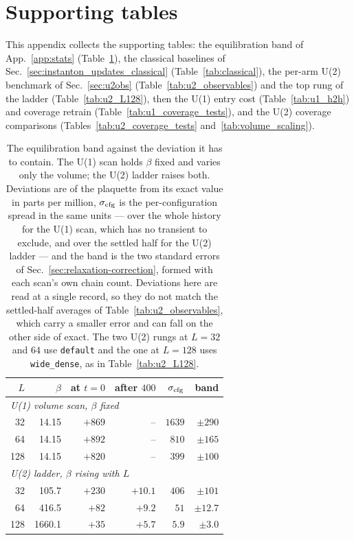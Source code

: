 \documentclass[prd, twocolumn, superscriptaddress, nofootinbib,floatfix]{revtex4-2}
\DeclareRobustCommand{\app}[1]{App.~\ref{app:#1}}
\DeclareRobustCommand{\sect}[1]{Sec.~\ref{sec:#1}}
\DeclareRobustCommand{\tb}[1]{Table~\ref{tab:#1}}
\DeclareRobustCommand{\tbs}[2]{Tables~\ref{tab:#1} and~\ref{tab:#2}}
\begin{document}
\section{Supporting tables}
\label{app:tables}

This appendix collects the supporting tables: the equilibration band of
\app{stats} (\tb{band_scaling}), the
classical baselines of \sect{instanton_updates_classical} (\tb{classical}), the
per-arm U(2) benchmark of \sect{u2obs} (\tb{u2_observables}) and the top rung of
the ladder (\tb{u2_L128}), then the U(1) entry cost (\tb{u1_h2h}) and coverage
retrain (\tb{u1_coverage_tests}), and the U(2) coverage comparisons
(\tbs{u2_coverage_tests}{volume_scaling}).

\begin{table}[htbp]
\centering
\small
\caption{The equilibration band against the deviation it has to contain. The
U(1) scan holds $\beta$ fixed and varies only the volume; the U(2) ladder raises
both. Deviations are of the plaquette from its exact value in parts per million,
$\sigma_{\rm cfg}$ is the per-configuration spread in the same units --- over
the whole history for the U(1) scan, which has no transient to exclude, and
over the settled half for the U(2) ladder --- and the
band is the two standard errors of \sect{relaxation-correction}, formed with
each scan's own chain count. Deviations here are read at a single record, so
they do not match the settled-half averages of \tb{u2_observables}, which carry
a smaller error and can fall on the other side of exact. The two U(2) rungs at
$L=32$ and $64$ use \texttt{default} and the one at $L=128$ uses
\texttt{wide\_dense}, as in \tb{u2_L128}.}
\label{tab:band_scaling}
\begin{tabular}{rrrrrr}
\toprule
$L$ & $\beta$ & at $t=0$ & after $400$ & $\sigma_{\rm cfg}$ & band \\
\midrule
\multicolumn{6}{l}{\textit{U(1) volume scan, $\beta$ fixed}} \\
32  & 14.15 & $+869$ & -- & $1639$ & $\pm290$ \\
64  & 14.15 & $+892$ & -- & $810$ & $\pm165$ \\
128 & 14.15 & $+820$ & -- & $399$ & $\pm100$ \\
\midrule
\multicolumn{6}{l}{\textit{U(2) ladder, $\beta$ rising with $L$}} \\
32  & 105.7  & $+230$ & $+10.1$ & $406$ & $\pm101$ \\
64  & 416.5  & $+82$  & $+9.2$  & $51$  & $\pm12.7$ \\
128 & 1660.1 & $+35$  & $+5.7$  & $5.9$ & $\pm3.0$ \\
\bottomrule
\end{tabular}
\end{table}
\end{document}
